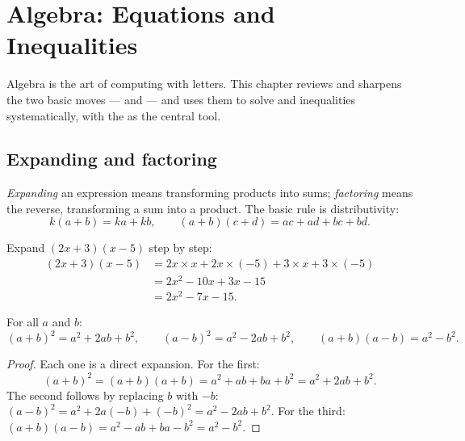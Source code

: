 \chapter{Algebra: Equations and Inequalities}\label{ch:g10:algebra}

Algebra is the art of computing with letters. This chapter reviews and
sharpens the two basic moves ---  and  --- and uses them
to solve  and inequalities systematically, with the  as
the central tool.

\section{Expanding and factoring}

\begin{definition}\label{def:g10:algebra:expand}
\emph{Expanding} an expression means transforming
products into sums; \emph{factoring} means the reverse,
transforming a sum into a product. The basic rule is distributivity:
\[
k(a + b) = ka + kb,
\qquad
(a + b)(c + d) = ac + ad + bc + bd .
\]
\end{definition}

\begin{example}\label{ex:g10:algebra:expand}
Expand $(2x + 3)(x - 5)$ step by step:
\begin{align*}
(2x + 3)(x - 5)
&= 2x \times x + 2x \times (-5) + 3 \times x + 3 \times (-5) \\
&= 2x^2 - 10x + 3x - 15 \\
&= 2x^2 - 7x - 15 .
\end{align*}
\end{example}

\begin{theorem}\label{thm:g10:algebra:identities}
For all  $a$ and $b$:
\[
(a+b)^2 = a^2 + 2ab + b^2,
\qquad
(a-b)^2 = a^2 - 2ab + b^2,
\qquad
(a+b)(a-b) = a^2 - b^2 .
\]
\end{theorem}

\begin{proof}
Each one is a direct expansion. For the first:
\[
(a+b)^2 = (a+b)(a+b) = a^2 + ab + ba + b^2 = a^2 + 2ab + b^2 .
\]
The second follows by replacing $b$ with $-b$: $(a-b)^2 = a^2 + 2a(-b) +
(-b)^2 = a^2 - 2ab + b^2$. For the third:
$(a+b)(a-b) = a^2 - ab + ba - b^2 = a^2 - b^2$.
\end{proof}

